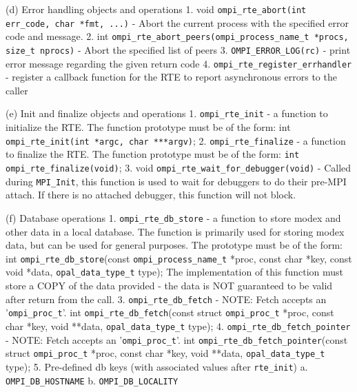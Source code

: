  (d) Error handling objects and operations
     1. void \verb|ompi_rte_abort(int err_code, char *fmt, ...)| - Abort the current process with the specified error code and message.
     2. int \verb|ompi_rte_abort_peers(ompi_process_name_t *procs, size_t nprocs)| -
        Abort the specified list of peers
     3. \verb|OMPI_ERROR_LOG(rc)| - print error message regarding the given return code
     4. \verb|ompi_rte_register_errhandler| - register a callback function for the RTE to report asynchronous errors to the caller

 (e) Init and finalize objects and operations
     1. \verb|ompi_rte_init| - a function to initialize the RTE. The function
        prototype must be of the form:
        int \verb|ompi_rte_init(int *argc, char ***argv)|;
     2. \verb|ompi_rte_finalize| - a function to finalize the RTE. The function
        prototype must be of the form:
        \verb|int ompi_rte_finalize(void)|;
     3. void \verb|ompi_rte_wait_for_debugger(void)| - Called during \verb|MPI_Init|, this function is used to wait for debuggers to do their pre-MPI attach.
        If there is no attached debugger, this function will not block.

 (f) Database operations
     1. \verb|ompi_rte_db_store| - a function to store modex and other data in
        a local database. The function is primarily used for storing modex
        data, but can be used for general purposes. The prototype must be
        of the form:
        int \verb|ompi_rte_db_store|(const \verb|ompi_process_name_t| *proc,
                              const char *key, const void *data,
                              \verb|opal_data_type_t| type);
        The implementation of this function must store a COPY of the data
        provided - the data is NOT guaranteed to be valid after return
        from the call.
     3. \verb|ompi_rte_db_fetch| -
        NOTE: Fetch accepts an '\verb|ompi_proc_t|'.
        int \verb|ompi_rte_db_fetch|(const struct \verb|ompi_proc_t| *proc,
                              const char *key,
                              void **data,
                              \verb|opal_data_type_t| type);
     4. \verb|ompi_rte_db_fetch_pointer| -
        NOTE: Fetch accepts an '\verb|ompi_proc_t|'.
        int \verb|ompi_rte_db_fetch_pointer|(const struct \verb|ompi_proc_t| *proc,
                                      const char *key,
                                      void **data,
                                      \verb|opal_data_type_t| type);
     5. Pre-defined db keys (with associated values after \verb|rte_init|)
        a. \verb|OMPI_DB_HOSTNAME|
        b. \verb|OMPI_DB_LOCALITY|

